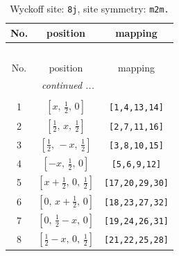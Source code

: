 \documentclass[fleqn,8pt]{jsarticle}
\begin{document}
\begin{longtable}{ccc}
\caption{Wyckoff site: {\tt 8j}, site symmetry: {\tt m2m.}}
 \\
 \hline \hline
No. & position & mapping \\ \hline \endfirsthead

\multicolumn{2}{l}{\tablename\ \thetable{}} \\
 \hline \hline
No. & position & mapping \\ \hline \endhead

 \hline \hline
\multicolumn{2}{r}{\footnotesize\it continued ...} \\ \endfoot

 \hline \hline
\multicolumn{2}{r}{} \\ \endlastfoot

1 & $\left[ x,\, \frac{1}{2},\, 0 \right]$ & {\tt [1,4,13,14]} \\ \hline
2 & $\left[ \frac{1}{2},\, x,\, \frac{1}{2} \right]$ & {\tt [2,7,11,16]} \\ \hline
3 & $\left[ \frac{1}{2},\, - x,\, \frac{1}{2} \right]$ & {\tt [3,8,10,15]} \\ \hline
4 & $\left[ - x,\, \frac{1}{2},\, 0 \right]$ & {\tt [5,6,9,12]} \\ \hline
5 & $\left[ x + \frac{1}{2},\, 0,\, \frac{1}{2} \right]$ & {\tt [17,20,29,30]} \\ \hline
6 & $\left[ 0,\, x + \frac{1}{2},\, 0 \right]$ & {\tt [18,23,27,32]} \\ \hline
7 & $\left[ 0,\, \frac{1}{2} - x,\, 0 \right]$ & {\tt [19,24,26,31]} \\ \hline
8 & $\left[ \frac{1}{2} - x,\, 0,\, \frac{1}{2} \right]$ & {\tt [21,22,25,28]} \\
\end{longtable}
\renewcommand{\arraystretch}{1.2}
\end{document}
